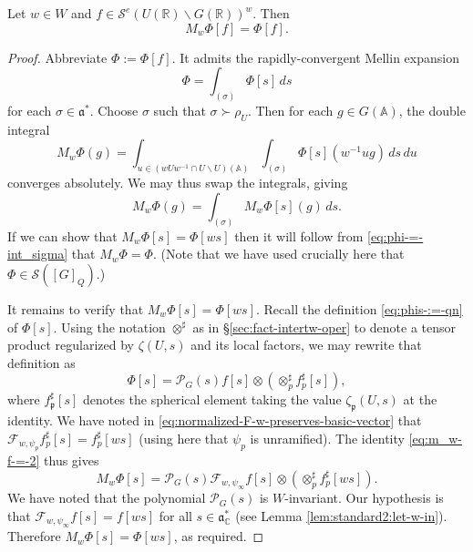 \begin{lemma}\label{lem:standard2:let-f_infty-in}
  Let $w \in W$ and $f \in \mathcal{S}^e(U(\mathbb{R}) \backslash G(\mathbb{R}))^w$.  Then
  \begin{equation*}
    M_w \Phi[f] =
    \Phi[f].
  \end{equation*}
\end{lemma}
\begin{proof}
  Abbreviate $\Phi := \Phi[f]$.  It admits the rapidly-convergent Mellin expansion
  \begin{equation}\label{eq:phi-=-int_sigma}
    \Phi = \int_{(\sigma)} \Phi[s] \, d s
  \end{equation}
  for each $\sigma \in \mathfrak{a}^*$.  Choose $\sigma$ such that $\sigma \succ \rho_{U}$.  Then for each $g \in G(\mathbb{A})$, the double integral
  \begin{equation*}
    M_w \Phi(g) = \int_{u \in
      (w U w^{-1} \cap U \backslash  U)(\mathbb{A})} \int_{(\sigma)}  \Phi[s](w^{-1} u g) \, d s \, d u
  \end{equation*}
  converges absolutely.  We may thus swap the integrals, giving
  \begin{equation*}
    M_w \Phi(g) = \int_{(\sigma) } M_w \Phi[s](g) \, d s.
  \end{equation*}
  If we can show that $M_w \Phi[s] = \Phi[w s]$ then it will follow from \eqref{eq:phi-=-int_sigma} that $M_w \Phi = \Phi$.  (Note that we have used crucially here that $\Phi \in \mathcal{S}([G]_{Q})$.)

  It remains to verify that $M_w \Phi[s] = \Phi[w s]$.  Recall the definition \eqref{eq:phis-:=-qn} of $\Phi[s]$.  Using the notation $\otimes^\sharp$ as in \S\ref{sec:fact-intertw-oper} to denote a tensor product regularized by $\zeta(U,s)$ and its local factors, we may rewrite that definition as
  \begin{equation*}
    \Phi[s] = \mathcal{P}_G(s) f[s] \otimes (\otimes_{p} ^\sharp f_p^\sharp [s]),
  \end{equation*}
  where $f_\mathfrak{p} ^\sharp [s]$ denotes the spherical element taking the value $\zeta_\mathfrak{p}(U,s)$ at the identity.  We have noted in \eqref{eq:normalized-F-w-preserves-basic-vector} that $\mathcal{F}_{w,\psi_p} f_p^\sharp[s] = f_p^\sharp [w s]$ (using here that $\psi_p$ is unramified).  The identity \eqref{eq:m_w-f-=-2} thus gives
  \begin{equation*}
    M_w \Phi[s] = \mathcal{P}_G(s) \mathcal{F}_{w,\psi_\infty} f[s] \otimes (\otimes_p^\sharp f_p^\sharp [w s]).
  \end{equation*}
  We have noted that the polynomial $\mathcal{P}_G(s)$ is $W$-invariant.  Our hypothesis is that $\mathcal{F}_{w,\psi_\infty} f[s] = f[ w s]$ for all $s \in \mathfrak{a}_{\mathbb{C}}^*$ (see Lemma \ref{lem:standard2:let-w-in}).  Therefore $M_w \Phi[s] = \Phi[w s]$, as required.
\end{proof}


